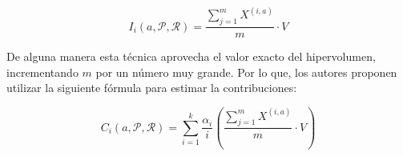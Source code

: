     \[I_i\left(a, \mathcal{P},\mathcal{R} \right) = \frac{\sum^{m}_{j=1}{X^{\left(i, a\right)}}}{m} \cdot V\]

  De alguna manera esta t\'ecnica aprovecha el valor exacto del hipervolumen, incrementando $m$ por un n\'umero muy grande. Por lo 
  que, los autores proponen utilizar la siguiente f\'ormula para estimar la contribuciones:

  \[C_i\left(a, \mathcal{P},\mathcal{R} \right) = \sum^{k}_{i=1}{\frac{\alpha_i}{i}}\left(\frac{\sum^{m}_{j=1}{X^{\left(i, a\right)}}}{m} \cdot V\right)\]
    \DIFdelbegin %

\DIFdelend 

